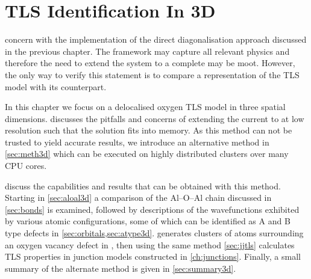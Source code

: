 
\chapter[TLS Identification In \lin{3D}]{TLS Identification In 3D}\label{ch:threedee}

 concern with the implementation of the direct diagonalisation approach discussed in the previous chapter.
The  framework may capture all relevant physics and therefore the need to extend the system to a complete  may be moot.
However, the only way to verify this statement is to compare a  representation of the TLS model with its  counterpart.

In this chapter we focus on a delocalised oxygen TLS model in three spatial dimensions.
 discusses the pitfalls and concerns of extending the current  to  at low resolution such that the solution fits into memory.
As this method can not be trusted to yield accurate results, we introduce an alternative method in \cref{sec:meth3d} which can be executed on highly distributed clusters over many CPU cores.

 discuss the capabilities and results that can be obtained with this method.
Starting in \cref{sec:aloal3d} a comparison of the Al--O--Al chain discussed in \cref{sec:bonds} is examined, followed by descriptions of the wavefunctions exhibited by various atomic configurations, some of which can be identified as A and B type defects in \cref{sec:orbitals,sec:atype3d}.
 generates clusters of atoms surrounding an oxygen vacancy defect in , then using the same method \cref{sec:jjtls} calculates TLS properties in junction models constructed in \cref{ch:junctions}.
Finally, a small summary of the alternate method is given in \cref{sec:summary3d}.

